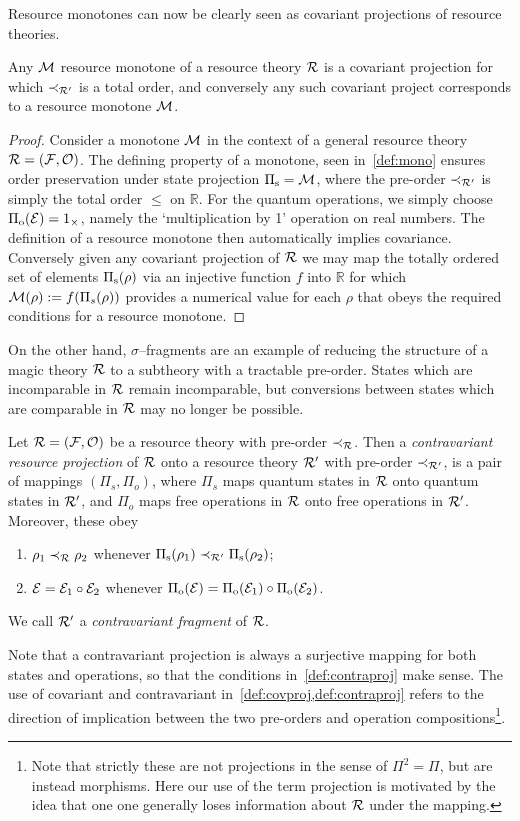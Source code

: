 \documentclass[pra,
aps,
twocolumn,
superscriptaddress,
groupedaddress,
nofootinbib,
reprint
]{revtex4-1}
\begin{document}
Resource monotones can now be clearly seen as covariant projections of resource theories.
\begin{proposition}\label{thm:monoproj}
	Any $\mathcal{M}$ resource monotone of a resource theory $\mathcal{R}$ is a covariant projection for which $\prec_{\mathcal{R}'}$ is a total order, and conversely any such covariant project corresponds to a resource monotone $\mathcal{M}$. 
\end{proposition}
\begin{proof}
	Consider a monotone $\mathcal{M}$ in the context of a general resource theory $\mathcal{R} = (\mathcal{F}, \mathcal{O})$.
	The defining property of a monotone, seen in~\cref{def:mono} ensures order preservation under state projection $\Pi_{\rm{s}} = \mathcal{M}$, where the pre-order $\prec_{\mathcal{R}'}$ is simply the total order $\leq$ on $\mathbb{R}$. For the quantum operations, we simply choose $\Pi_{\rm{o}}(\mathcal{E}) = 1_\times$, namely the `multiplication by 1' operation on real numbers. The definition of a resource monotone then automatically implies covariance. Conversely given any covariant projection of $\mathcal{R}$ we may map the totally ordered set of elements $\Pi_{\rm{s}}(\rho)$ via an injective function $f$ into $\mathbb{R}$ for which $\mathcal{M}(\rho):=f(\Pi_s(\rho))$ provides a numerical value for each $\rho$ that obeys the required conditions for a resource monotone. 
	
\end{proof}

On the other hand, $\sigma$--fragments are an example of reducing the structure of a magic theory $\mathcal{R}$ to a subtheory with a tractable pre-order.
States which are incomparable in $\mathcal{R}$ remain incomparable, but conversions between states which are comparable in $\mathcal{R}$ may no longer be possible.
\begin{definition}\label{def:contraproj}
	Let $\mathcal{R} = (\mathcal{F}, \mathcal{O})$ be a resource theory with pre-order $\prec_{\mathcal{R}}$. 
Then a \emph{contravariant resource projection} of $\mathcal{R}$ onto a resource theory $\mathcal{R}'$ with pre-order $\prec_{\mathcal{R}'}$, is a pair of mappings $(\Pi_s, \Pi_o)$, where $\Pi_s$ maps quantum states in $\mathcal{R}$ onto quantum states in $\mathcal{R}'$, and $\Pi_o$ maps free operations in $\mathcal{R}$ onto free operations in $\mathcal{R}'$. 
Moreover, these obey
	\begin{enumerate}
        \item $\rho_1 \prec_{\mathcal{R}} \rho_2$ whenever $\Pi_{\rm{s}}(\rho_1) \prec_{\mathcal{R}'} \Pi_{\rm{s}}(\rho_2)$;
        \item $\mathcal{E} = \mathcal{E}_1 \circ \mathcal{E}_2$ whenever $\Pi_{\rm{o}}(\mathcal{E}) = \Pi_{\rm{o}}(\mathcal{E}_1) \circ \Pi_{\rm{o}}(\mathcal{E}_2)$.
    \end{enumerate}
We call $\mathcal{R}'$ a \emph{contravariant fragment} of $\mathcal{R}$.
\end{definition}
Note that a contravariant projection is always a surjective mapping for both states and operations, so that the conditions in~\cref{def:contraproj} make sense.
The use of covariant and contravariant in~\cref{def:covproj,def:contraproj} refers to the direction of implication between the two pre-orders and operation compositions\footnote{Note that strictly these are not projections in the sense of $\Pi^2 = \Pi$, but are instead morphisms. 
Here our use of the term projection is motivated by the idea that one one generally loses information about $\mathcal{R}$ under the mapping.}.
\end{document}
